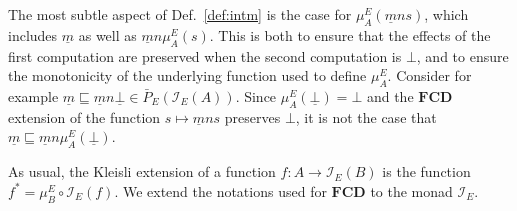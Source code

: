 \documentclass[draft,11pt]{report}
\begin{document}
%


The most subtle aspect of Def.~\ref{def:intm}
is the case for $\mu^E_A(\underline{m} n s)$,
which includes $\underline{m}$ as well as $\underline{m} n \mu^E_A(s)$.
This is both
to ensure that the effects of the first computation are preserved
when the second computation is $\bot$, and
to ensure the monotonicity of the underlying function
used to define $\mu^E_A$.
Consider for example
$\underline{m} \sqsubseteq
 \underline{m} n \underline{\bot} \in \bar{P}_E(\mathcal{I}_E(A))$.
Since $\mu^E_A(\underline{\bot}) = \bot$ and
the $\mathbf{FCD}$ extension
of the function $s \mapsto \underline{m} n s$
preserves $\bot$,
it is not the case that
$\underline{m} \sqsubseteq
 \underline{m} n \mu^E_A(\underline{\bot})$.

As usual,
the Kleisli extension of a function $f : A \rightarrow \mathcal{I}_E(B)$
is the function $f^* = \mu^E_B \circ \mathcal{I}_E(f)$.
We extend the notations used for $\mathbf{FCD}$
to the monad $\mathcal{I}_E$.

\end{document}

